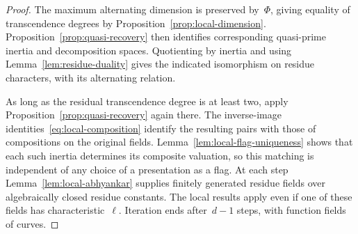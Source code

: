\begin{proof}
The maximum alternating dimension is preserved by~\(\Phi\), giving
equality of transcendence degrees by
Proposition~\ref{prop:local-dimension}.  Proposition~\ref{prop:quasi-recovery}
then identifies corresponding quasi-prime inertia and decomposition
spaces.  Quotienting by inertia and using
Lemma~\ref{lem:residue-duality} gives the indicated isomorphism on
residue characters, with its alternating relation.

As long as the residual transcendence degree is at least two, apply
Proposition~\ref{prop:quasi-recovery} again there.  The inverse-image
identities~\eqref{eq:local-composition} identify the resulting pairs
with those of compositions on the original fields.
Lemma~\ref{lem:local-flag-uniqueness} shows that each such inertia
determines its composite valuation, so this matching is independent
of any choice of a presentation as a flag.  At each step
Lemma~\ref{lem:local-abhyankar} supplies finitely generated residue
fields over algebraically closed residue constants.  The local
results apply even if one of these fields has characteristic~\(\ell\).
Iteration ends after~\(d-1\) steps, with function fields of curves.
\end{proof}
